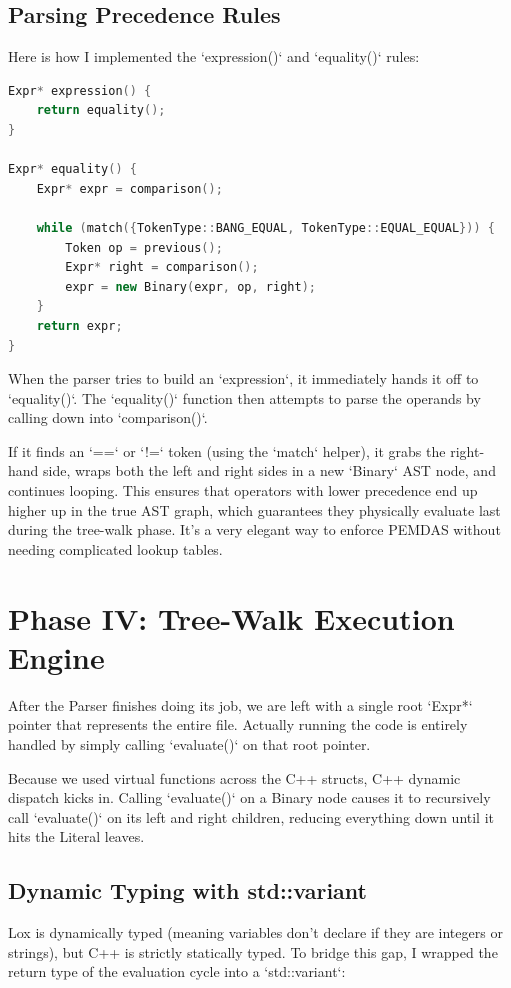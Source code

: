 \documentclass[12pt,a4paper,oneside]{report}
\begin{document}
\section{Parsing Precedence Rules}

Here is how I implemented the `expression()` and `equality()` rules:

\begin{lstlisting}[language=C++]
Expr* expression() {
    return equality();
}

Expr* equality() {
    Expr* expr = comparison();

    while (match({TokenType::BANG_EQUAL, TokenType::EQUAL_EQUAL})) {
        Token op = previous();
        Expr* right = comparison();
        expr = new Binary(expr, op, right);
    }
    return expr;
}
\end{lstlisting}

When the parser tries to build an `expression`, it immediately hands it off to `equality()`. The `equality()` function then attempts to parse the operands by calling down into `comparison()`. 

If it finds an `==` or `!=` token (using the `match` helper), it grabs the right-hand side, wraps both the left and right sides in a new `Binary` AST node, and continues looping. This ensures that operators with lower precedence end up higher up in the true AST graph, which guarantees they physically evaluate last during the tree-walk phase. It’s a very elegant way to enforce PEMDAS without needing complicated lookup tables.

\chapter{Phase IV: Tree-Walk Execution Engine}

After the Parser finishes doing its job, we are left with a single root `Expr*` pointer that represents the entire file. Actually running the code is entirely handled by simply calling `evaluate()` on that root pointer.

Because we used virtual functions across the C++ structs, C++ dynamic dispatch kicks in. Calling `evaluate()` on a Binary node causes it to recursively call `evaluate()` on its left and right children, reducing everything down until it hits the Literal leaves.

\section{Dynamic Typing with std::variant}
Lox is dynamically typed (meaning variables don't declare if they are integers or strings), but C++ is strictly statically typed. To bridge this gap, I wrapped the return type of the evaluation cycle into a `std::variant`:
\end{document}
